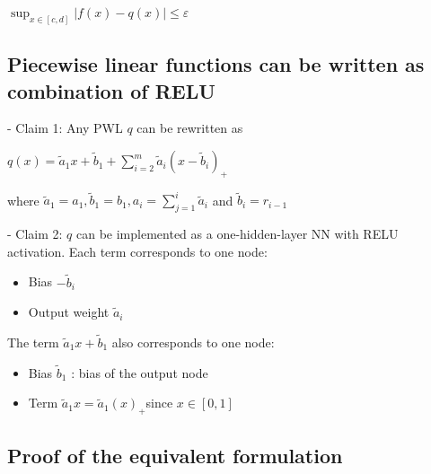 $
\sup _{x \in[c, d]}|f(x)-q(x)| \leq \varepsilon
$






\subsection*{Piecewise linear functions can be written as combination of RELU}
- Claim 1: Any PWL $q$ can be rewritten as

$
q(x)=\tilde{a}_{1} x+\tilde{b}_{1}+\sum_{i=2}^{m} \tilde{a}_{i}\left(x-\tilde{b}_{i}\right)_{+}
$

where $\tilde{a}_{1}=a_{1}, \tilde{b}_{1}=b_{1}, a_{i}=\sum_{j=1}^{i} \tilde{a}_{i}$ and $\tilde{b}_{i}=r_{i-1}$

- Claim 2: $q$ can be implemented as a one-hidden-layer NN with RELU activation. Each term corresponds to one node:

\begin{itemize}
  \item Bias $-\tilde{b}_{i}$
  \item Output weight $\tilde{a}_{i}$
\end{itemize}

The term $\tilde{a}_{1} x+\tilde{b}_{1}$ also corresponds to one node:

\begin{itemize}
  \item Bias $\tilde{b}_{1}$ : bias of the output node
\end{itemize}



\begin{itemize}
  \item Term $\tilde{a}_{1} x=\tilde{a}_{1}(x)_{+}$since $x \in[0,1]$
\end{itemize}

\subsection*{Proof of the equivalent formulation}

